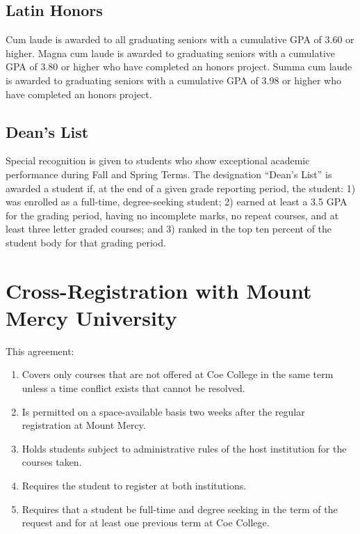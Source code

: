 \documentclass[
  letterpaper,
]{scrbook}
\providecommand{\tightlist}{%
  \setlength{\itemsep}{0pt}\setlength{\parskip}{0pt}}
\begin{document}
\hypertarget{latin-honors}{%
\subsection{Latin Honors}\label{latin-honors}}

Cum laude is awarded to all graduating seniors with a cumulative GPA of
3.60 or higher. Magna cum laude is awarded to graduating seniors with a
cumulative GPA of 3.80 or higher who have completed an honors project.
Summa cum laude is awarded to graduating seniors with a cumulative GPA
of 3.98 or higher who have completed an honors project.

\hypertarget{deans-list}{%
\subsection{Dean's List}\label{deans-list}}

Special recognition is given to students who show exceptional academic
performance during Fall and Spring Terms. The designation ``Dean's
List'' is awarded a student if, at the end of a given grade reporting
period, the student: 1) was enrolled as a full-time, degree-seeking
student; 2) earned at least a 3.5 GPA for the grading period, having no
incomplete marks, no repeat courses, and at least three letter graded
courses; and 3) ranked in the top ten percent of the student body for
that grading period.

\hypertarget{cross-registration-with-mount-mercy-university}{%
\section{Cross-Registration with Mount Mercy
University}\label{cross-registration-with-mount-mercy-university}}

This agreement:

\begin{enumerate}
\def\labelenumi{\arabic{enumi}.}
\tightlist
\item
  Covers only courses that are not offered at Coe College in the same
  term unless a time conflict exists that cannot be resolved.
\item
  Is permitted on a space-available basis two weeks after the regular
  registration at Mount Mercy.
\item
  Holds students subject to administrative rules of the host institution
  for the courses taken.
\item
  Requires the student to register at both institutions.
\item
  Requires that a student be full-time and degree seeking in the term of
  the request and for at least one previous term at Coe College.
\end{enumerate}
\end{document}
